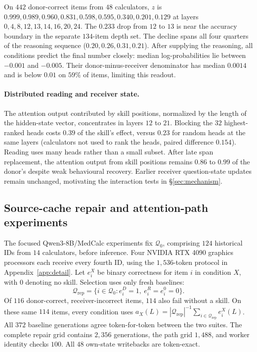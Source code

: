 On $442$ donor-correct items from $48$ calculators, $z$ is
$0.999,0.989,0.960,0.831,0.598,0.595,0.340,0.201,0.129$ at layers
$0,4,8,12,13,14,16,20,24$. The $0.233$ drop from $12$ to $13$ is near
the accuracy boundary in the separate $134$-item depth set.
The decline spans all four quarters of the reasoning sequence
($0.20,0.26,0.31,0.21$). After supplying the reasoning, all conditions
predict the final number closely: median log-probabilities lie between
$-0.001$ and $-0.005$. Their donor-minus-receiver denominator has median
$0.0014$ and is below $0.01$ on $59\%$ of items, limiting this readout.

\paragraph{Distributed reading and receiver state.}
The attention output contributed by skill positions,
normalized by the length of the hidden-state vector, concentrates in
layers $12$ to $21$. Blocking the $32$ highest-ranked
heads costs $0.39$ of the skill's effect, versus $0.23$ for random heads at the
same layers (calculators not used to rank the heads, paired difference $0.154$). Reading uses many heads rather than a small subset. After late span replacement, the attention output from skill positions remains
$0.86$ to $0.99$ of the donor's despite weak behavioural recovery. Earlier receiver question-state updates remain unchanged, motivating
the interaction tests in \S\ref{sec:mechanism}.


\subsection{Source-cache repair and attention-path experiments}
\label{app:mechanism}

The focused Qwen3-8B/MedCalc experiments fix $\mathcal Q_0$, comprising
$124$ historical IDs from $14$ calculators, before inference. Four NVIDIA
RTX 4090 graphics processors each receive every fourth ID, using the
$1{,}536$-token protocol in Appendix~\ref{app:detail}.
Let $e_i^X$ be binary correctness for item $i$ in condition $X$, with
$0$ denoting no skill. Selection uses only fresh baselines:
\begin{equation}
\mathcal Q_{\mathrm{rep}}
=\{i\in\mathcal Q_0:e_i^D=1,\ e_i^R=e_i^0=0\}.
\label{eq:repair-set}
\end{equation}
Of $116$ donor-correct, receiver-incorrect items, $114$ also fail without
a skill. On these same $114$ items, every condition uses
$a_X(L)=|\mathcal Q_{\mathrm{rep}}|^{-1}
\sum_{i\in\mathcal Q_{\mathrm{rep}}}e_i^X(L)$.
All $372$ baseline generations agree
token-for-token between the two suites. The complete repair grid contains
$2{,}356$ generations, the path grid $1{,}488$, and worker identity checks
$100$. All $48$ own-state writebacks are token-exact.

